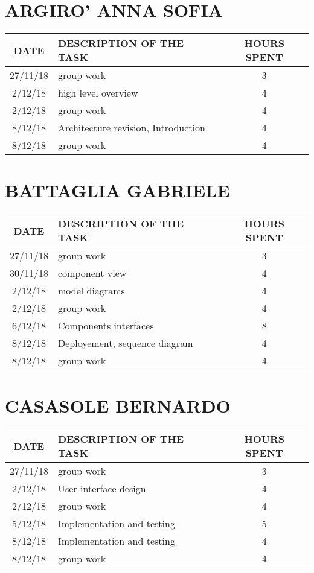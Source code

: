 \section{ARGIRO' ANNA SOFIA}
\begin{table}[h!]
\begin{tabular}{|c|p{3in}|c|}
\hline
\textbf{DATE} &\textbf{DESCRIPTION OF THE TASK} & \textbf{HOURS SPENT}\\
\hline
27/11/18 & group work & 3\\
\hline
2/12/18 & high level overview & 4\\
\hline
2/12/18 & group work & 4\\
\hline
8/12/18 & Architecture revision, Introduction & 4\\
\hline
8/12/18 & group work & 4\\
\hline
\end{tabular}
\end{table}

\clearpage


\section{BATTAGLIA GABRIELE}
\begin{table}[h!]
	\begin{tabular}{|c|p{3in}|c|}
\hline
\textbf{DATE} &\textbf{DESCRIPTION OF THE TASK} & \textbf{HOURS SPENT}\\
\hline
27/11/18 & group work & 3\\
\hline
30/11/18 & component view & 4\\
\hline
2/12/18 & model diagrams & 4\\
\hline
2/12/18 & group work & 4\\
\hline
6/12/18 & Components interfaces & 8\\
\hline
8/12/18 & Deployement, sequence diagram & 4\\
\hline
8/12/18 & group work & 4\\
\hline
	\end{tabular}
\end{table}

\clearpage

\section{CASASOLE BERNARDO}
\begin{table}[h!]
	\begin{tabular}{|c|p{3in}|c|}
\hline
\textbf{DATE} &\textbf{DESCRIPTION OF THE TASK} & \textbf{HOURS SPENT}\\
\hline
27/11/18 & group work & 3\\
\hline
2/12/18 & User interface design & 4\\
\hline
2/12/18 & group work & 4\\
\hline
5/12/18 & Implementation and testing & 5\\
\hline
8/12/18 & Implementation and testing & 4\\
\hline
8/12/18 & group work & 4\\
\hline
	\end{tabular}
\end{table}